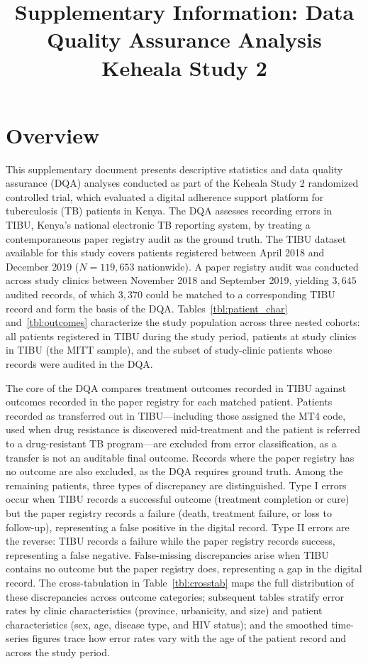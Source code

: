 \documentclass[12pt]{article}
\title{Supplementary Information: Data Quality Assurance Analysis\\
\large Keheala Study 2}
\date{}
\begin{document}
\maketitle
\tableofcontents
\newpage

\section*{Overview}

This supplementary document presents descriptive statistics and data quality assurance (DQA) analyses conducted as part of the Keheala Study 2 randomized controlled trial, which evaluated a digital adherence support platform for tuberculosis (TB) patients in Kenya. The DQA assesses recording errors in TIBU, Kenya's national electronic TB reporting system, by treating a contemporaneous paper registry audit as the ground truth. The TIBU dataset available for this study covers patients registered between April 2018 and December 2019 ($N = 119{,}653$ nationwide). A paper registry audit was conducted across study clinics between November 2018 and September 2019, yielding $3{,}645$ audited records, of which $3{,}370$ could be matched to a corresponding TIBU record and form the basis of the DQA. Tables~\ref{tbl:patient_char} and~\ref{tbl:outcomes} characterize the study population across three nested cohorts: all patients registered in TIBU during the study period, patients at study clinics in TIBU (the MITT sample), and the subset of study-clinic patients whose records were audited in the DQA.

The core of the DQA compares treatment outcomes recorded in TIBU against outcomes recorded in the paper registry for each matched patient. Patients recorded as transferred out in TIBU---including those assigned the MT4 code, used when drug resistance is discovered mid-treatment and the patient is referred to a drug-resistant TB program---are excluded from error classification, as a transfer is not an auditable final outcome. Records where the paper registry has no outcome are also excluded, as the DQA requires ground truth. Among the remaining patients, three types of discrepancy are distinguished. Type I errors occur when TIBU records a successful outcome (treatment completion or cure) but the paper registry records a failure (death, treatment failure, or loss to follow-up), representing a false positive in the digital record. Type II errors are the reverse: TIBU records a failure while the paper registry records success, representing a false negative. False-missing discrepancies arise when TIBU contains no outcome but the paper registry does, representing a gap in the digital record. The cross-tabulation in Table~\ref{tbl:crosstab} maps the full distribution of these discrepancies across outcome categories; subsequent tables stratify error rates by clinic characteristics (province, urbanicity, and size) and patient characteristics (sex, age, disease type, and HIV status); and the smoothed time-series figures trace how error rates vary with the age of the patient record and across the study period.
\end{document}
